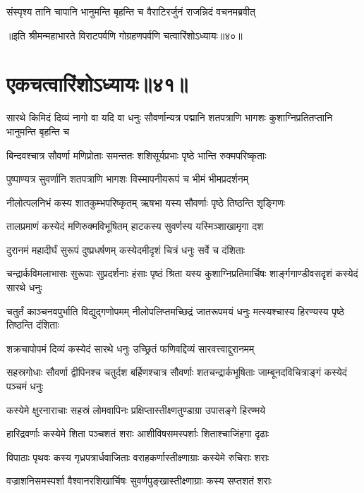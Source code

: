 \twolineshloka
{संस्पृश्य तानि चापानि भानुमन्ति बृहन्ति च}
{वैराटिरर्जुनं राजन्निदं वचनमब्रवीत्}

॥इति श्रीमन्महाभारते विराटपर्वणि गोग्रहणपर्वणि चत्वारिंशोऽध्यायः॥४०॥

\chapter{एकचत्वारिंशोऽध्यायः॥४१॥}

\threelineshloka
{सारथे किमिदं दिव्यं नागो वा यदि वा धनुः}
{सौवर्णान्यत्र पद्मानि शतपत्राणि भागशः}
{कुशाग्निप्रतितप्तानि भानुमन्ति बृहन्ति च}


\twolineshloka
{बिन्दवश्चात्र सौवर्णा मणिप्रोताः समन्ततः}
{शशिसूर्यप्रभाः पृष्ठे भान्ति रुक्मपरिष्कृताः}


\twolineshloka
{पुष्पाण्यत्र सुवर्णानि शतपत्राणि भागशः}
{विस्मापनीयरूपं च भीमं भीमप्रदर्शनम्}


\twolineshloka
{नीलोत्पलनिभं कस्य शातकुम्भपरिष्कृतम्}
{ऋषभा यस्य सौवर्णाः पृष्ठे तिष्ठन्ति शृङ्गिणः}


\twolineshloka
{तालप्रमाणं कस्येदं मणिरुक्मविभूषितम्}
{हाटकस्य सुवर्णस्य यस्मिञ्शाखामृगा दश}

\twolineshloka
{दुरानमं महादीर्घं सुरूपं दुष्प्रधर्षणम्}
{कस्येदमीदृशं चित्रं धनुः सर्वे च दंशिताः}


\threelineshloka
{चन्द्रार्कविमलाभासः सुरूपाः सुप्रदर्शनाः}
{हंसाः पृष्ठं श्रिता यस्य कुशाग्निप्रतिमार्चिषः}
{शार्ङ्गगाण्डीवसदृशं कस्येदं सारथे धनुः}


\threelineshloka
{चतुर्तं काञ्चनवपुर्भाति विद्युद्गणोपमम्}
{नीलोपलिप्तमच्छिद्रं जातरूपमयं धनुः}
{मत्स्यश्चास्य हिरण्यस्य पृष्ठे तिष्ठन्ति दंशिताः}


\twolineshloka
{शक्रचापोपमं दिव्यं कस्येदं सारथे धनुः}
{उच्छ्रितं फणिवद्दिव्यं सारवत्त्वाद्दुरानमम्}


\threelineshloka
{सहस्रगोधाः सौवर्णा द्वीपिनश्च चतुर्दश}
{बर्हिणश्चात्र सौवर्णाः शतचन्द्रार्कभूषिताः}
{जाम्बूनदविचित्राङ्गं कस्येदं पञ्चमं धनुः}


\twolineshloka
{कस्येमे क्षुरनाराचाः सहस्रं लोमवापिनः}
{प्रक्षिप्तास्तीक्ष्णतुण्डाग्रा उपासङ्गे हिरण्मये}


\twolineshloka
{हारिद्रवर्णाः कस्येमे शिता पञ्चशतं शराः}
{आशीविषसमस्पर्शाः शिताश्चाजिंहगा दृढाः}


\twolineshloka
{विपाठाः पृथवः कस्य गृध्रपत्रार्धवाजिताः}
{वराहकर्णास्तीक्ष्णाग्राः कस्येमे रुचिराः शराः}


\twolineshloka
{वज्राशनिसमस्पर्शा वैश्वानरशिखार्चिषः}
{सुवर्णपुङ्खास्तीक्ष्णाग्राः कस्य सप्तशतं शराः}


